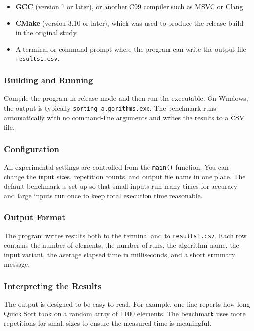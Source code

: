 \documentclass[12pt,a4paper]{article}
\theoremstyle{definition}
\begin{document}
\begin{itemize}[noitemsep]
  \item \textbf{GCC} (version 7 or later), or another C99 compiler such as MSVC or Clang.
  \item \textbf{CMake} (version 3.10 or later), which was used to produce the release build in the original study.
  \item A terminal or command prompt where the program can write the output file \texttt{results1.csv}.
\end{itemize}

\subsubsection*{Building and Running}

Compile the program in release mode and then run the executable. On Windows, the output is typically \texttt{sorting\_algorithms.exe}. The benchmark runs automatically with no command-line arguments and writes the results to a CSV file.

\subsubsection*{Configuration}

All experimental settings are controlled from the \texttt{main()} function. You can change the input sizes, repetition counts, and output file name in one place. The default benchmark is set up so that small inputs run many times for accuracy and large inputs run once to keep total execution time reasonable.

\subsubsection*{Output Format}

The program writes results both to the terminal and to \texttt{results1.csv}. Each row contains the number of elements, the number of runs, the algorithm name, the input variant, the average elapsed time in milliseconds, and a short summary message.

\subsubsection*{Interpreting the Results}

The output is designed to be easy to read. For example, one line reports how long Quick Sort took on a random array of 1\,000 elements. The benchmark uses more repetitions for small sizes to ensure the measured time is meaningful.
\end{document}
